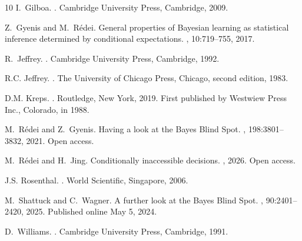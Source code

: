 \documentclass[10pt, letterpaper]{article}%
\theoremstyle{definition}
\newcommand{\1}{\mathbf 1}
\begin{document}
\begin{thebibliography}{10}
I.~Gilboa.
.
\newblock Cambridge University Press, Cambridge, 2009.

Z.~Gyenis and M.~R\'{e}dei.
\newblock General properties of {B}ayesian learning as statistical inference
  determined by conditional expectations.
, 10:719--755, 2017.

R.~Jeffrey.
.
\newblock Cambridge University Press, Cambridge, 1992.

R.C. Jeffrey.
.
\newblock The University of Chicago Press, Chicago, second edition, 1983.

D.M. Kreps.
.
\newblock Routledge, New York, 2019.
\newblock First published by Westwiew Press Inc., Colorado, in 1988.

M.~R\'{e}dei and Z.~Gyenis.
\newblock Having a look at the {B}ayes {B}lind {S}pot.
, 198:3801--3832, 2021.
\newblock Open access.

M.~R\'edei and H.~Jing.
\newblock Conditionally inaccessible decisions.
, 2026.
\newblock Open access.

J.S. Rosenthal.
.
\newblock World Scientific, Singapore, 2006.

M.~Shattuck and C.~Wagner.
\newblock A further look at the {B}ayes {B}lind {S}pot.
, 90:2401--2420, 2025.
\newblock Published online May 5, 2024.

D.~Williams.
.
\newblock Cambridge University Press, Cambridge, 1991.

\end{thebibliography}

%




%
%
\end{document}
